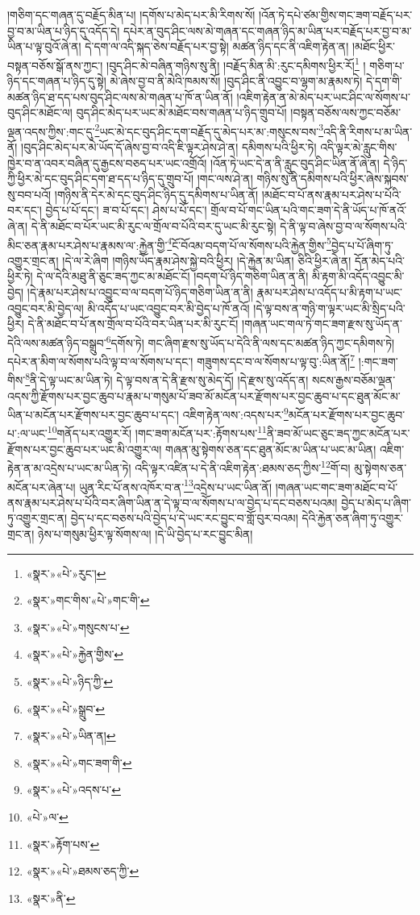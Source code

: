 །གཅིག་དང་གཞན་དུ་བརྗོད་མིན་པ། །དགོས་པ་མེད་པར་མི་རིགས་སོ། །འོན་ཏེ་དཔེ་ཙམ་གྱིས་གང་ཟག་བརྗོད་པར་བྱ་བ་མ་ཡིན་པ་ཉིད་དུ་འདོད་དེ། དཔེར་ན་བུད་ཤིང་ལས་མེ་གཞན་དང་གཞན་ཉིད་མ་ཡིན་པར་བརྗོད་པར་བྱ་བ་མ་ཡིན་པ་ལྟ་བུའོ་ཞེ་ན། དེ་དག་ལ་འདི་སྐད་ཅེས་བརྗོད་པར་བྱ་སྟེ། མཚན་ཉིད་དང་ནི་འཇིག་རྟེན་ན། །མཐོང་ཕྱིར་བསྟན་བཅོས་སྒོ་ནས་ཀྱང་། །བུད་ཤིང་མེ་བཞིན་གཉིས་སུ་ནི། །བརྗོད་མིན་མི་:རུང་དམིགས་ཕྱིར་རོ།\footnote{«སྣར་»«པེ་»རུང་།} །
གཅིག་པ་ཉིད་དང་གཞན་པ་ཉིད་དུ་སྟེ། མེ་ཞེས་བྱ་བ་ནི་མེའི་ཁམས་སོ། །བུད་ཤིང་ནི་འབྱུང་བ་ལྷག་མ་རྣམས་ཏེ། དེ་དག་གི་མཚན་ཉིད་ཐ་དད་པས་བུད་ཤིང་ལས་མེ་གཞན་པ་ཁོ་ན་ཡིན་ནོ། །འཇིག་རྟེན་ན་མེ་མེད་པར་ཡང་ཤིང་ལ་སོགས་པ་བུད་ཤིང་མཐོང་ལ། བུད་ཤིང་མེད་པར་ཡང་མེ་མཐོང་བས་གཞན་པ་ཉིད་གྲུབ་པོ། །བསྟན་བཅོས་ལས་ཀྱང་བཅོམ་ལྡན་འདས་ཀྱིས་:གང་དུ་\footnote{«སྣར་»གང་གིས་«པེ་»གང་གི་}ཡང་མེ་དང་བུད་ཤིང་དག་བརྗོད་དུ་མེད་པར་མ་:གསུངས་བས་\footnote{«སྣར་»«པེ་»གསུངས་པ་}འདི་ནི་རིགས་པ་མ་ཡིན་ནོ། །བུད་ཤིང་མེད་པར་མེ་ཡོད་དོ་ཞེས་བྱ་བ་འདི་ཇི་ལྟར་ཤེས་ཤེ་ན། དམིགས་པའི་ཕྱིར་ཏེ། འདི་ལྟར་མེ་རླུང་གིས་ཁྱེར་བ་ན་འབར་བཞིན་དུ་རྒྱངས་བཅད་པར་ཡང་འགྲོའོ། །འོན་ཏེ་ཡང་དེ་ན་ནི་རླུང་བུད་ཤིང་ཡིན་ནོ་ཞེ་ན། དེ་ཉིད་ཀྱི་ཕྱིར་མེ་དང་བུད་ཤིང་དག་ཐ་དད་པ་ཉིད་དུ་གྲུབ་པོ། །གང་ལས་ཤེ་ན། གཉིས་སུ་ནི་དམིགས་པའི་ཕྱིར་ཞེས་སྐབས་སུ་བབ་པའོ། །གཉིས་ནི་དེར་མེ་དང་བུད་ཤིང་ཉིད་དུ་དམིགས་པ་ཡིན་ནོ། །མཐོང་བ་པོ་ནས་རྣམ་པར་ཤེས་པ་པོའི་བར་དང་། བྱེད་པ་པོ་དང་། ཟ་བ་པོ་དང་། ཤེས་པ་པོ་དང་། གྲོལ་བ་པོ་གང་ཡིན་པའི་གང་ཟག་དེ་ནི་ཡོད་པ་ཁོ་ནའོ་ཞེ་ན། དེ་ནི་མཐོང་བ་པོར་ཡང་མི་རུང་ལ་གྲོལ་བ་པོའི་བར་དུ་ཡང་མི་རུང་སྟེ། དེ་ནི་ལྟ་བ་ཞེས་བྱ་བ་ལ་སོགས་པའི་མིང་ཅན་རྣམ་པར་ཤེས་པ་རྣམས་ལ་:རྐྱེན་གྱི་\footnote{«སྣར་»«པེ་»རྐྱེན་གྱིས་}ངོ་བོའམ་བདག་པོ་ལ་སོགས་པའི་རྐྱེན་གྱིས་\footnote{«སྣར་»«པེ་»ཉིད་ཀྱི་}བྱེད་པ་པོ་ཞིག་ཏུ་འགྱུར་གྲང་ན། །དེ་ལ་རེ་ཞིག །གཉིས་ཡོད་རྣམ་ཤེས་སྐྱེ་བའི་ཕྱིར། །དེ་རྐྱེན་མ་ཡིན། ཅིའི་ཕྱིར་ཞེ་ན། དོན་མེད་པའི་ཕྱིར་ཏེ། དེ་ལ་དེའི་མཐུ་ནི་ཅུང་ཟད་ཀྱང་མ་མཐོང་ངོ། །བདག་པོ་ཉིད་གཅིག་ཡིན་ན་ནི། མི་རྟག་མི་འདོད་འབྱུང་མི་བྱེད། །དེ་རྣམ་པར་ཤེས་པ་འབྱུང་བ་ལ་བདག་པོ་ཉིད་གཅིག་ཡིན་ན་ནི། རྣམ་པར་ཤེས་པ་འདོད་པ་མི་རྟག་པ་ཡང་འབྱུང་བར་མི་བྱེད་ལ། མི་འདོད་པ་ཡང་འབྱུང་བར་མི་བྱེད་པ་ཁོ་ནའོ། །དེ་ལྟ་བས་ན་གཉི་ག་ལྟར་ཡང་མི་སྲིད་པའི་ཕྱིར། དེ་ནི་མཐོང་བ་པོ་ནས་གྲོལ་བ་པོའི་བར་ཡིན་པར་མི་རུང་ངོ། །གཞན་ཡང་གལ་ཏེ་གང་ཟག་རྫས་སུ་ཡོད་ན་དེའི་ལས་མཚན་ཉིད་བསྒྲུབ་\footnote{«སྣར་»«པེ་»སྒྲུབ་}དགོས་ཏེ། གང་ཞིག་རྫས་སུ་ཡོད་པ་དེའི་ནི་ལས་དང་མཚན་ཉིད་ཀྱང་དམིགས་ཏེ། དཔེར་ན་མིག་ལ་སོགས་པའི་ལྟ་བ་ལ་སོགས་པ་དང་། གཟུགས་དང་བ་ལ་སོགས་པ་ལྟ་བུ་:ཡིན་ནོ།\footnote{«སྣར་»«པེ་»ཡིན་ན།} །:གང་ཟག་གིས་\footnote{«སྣར་»«པེ་»གང་ཟག་གི་}ནི་དེ་ལྟ་ཡང་མ་ཡིན་ཏེ། དེ་ལྟ་བས་ན་དེ་ནི་རྫས་སུ་མེད་དོ། །དེ་རྫས་སུ་འདོད་ན། སངས་རྒྱས་བཅོམ་ལྡན་འདས་ཀྱི་རྫོགས་པར་བྱང་ཆུབ་པ་རྣམ་པ་གསུམ་པོ་ཟབ་མོ་མངོན་པར་རྫོགས་པར་བྱང་ཆུབ་པ་དང་ཐུན་མོང་མ་ཡིན་པ་མངོན་པར་རྫོགས་པར་བྱང་ཆུབ་པ་དང་། འཇིག་རྟེན་ལས་:འདས་པར་\footnote{«སྣར་»«པེ་»འདས་པ་}མངོན་པར་རྫོགས་པར་བྱང་ཆུབ་པ་:ལ་ཡང་\footnote{«པེ་»ལ་}གནོད་པར་འགྱུར་རོ། །གང་ཟག་མངོན་པར་:རྟོགས་པས་\footnote{«སྣར་»རྟོག་པས་}ནི་ཟབ་མོ་ཡང་ཅུང་ཟད་ཀྱང་མངོན་པར་རྫོགས་པར་བྱང་ཆུབ་པར་ཡང་མི་འགྱུར་ལ། གཞན་མུ་སྟེགས་ཅན་དང་ཐུན་མོང་མ་ཡིན་པ་ཡང་མ་ཡིན། འཇིག་རྟེན་ན་མ་འདྲེས་པ་ཡང་མ་ཡིན་ཏེ། འདི་ལྟར་འཛིན་པ་དེ་ནི་འཇིག་རྟེན་:ཐམས་ཅད་ཀྱིས་\footnote{«སྣར་»«པེ་»ཐམས་ཅད་ཀྱི་}གོ་བ། མུ་སྟེགས་ཅན་མངོན་པར་ཞེན་པ། ཡུན་རིང་པོ་ནས་འཁོར་བ་ན་\footnote{«སྣར་»ནི་}འདྲེས་པ་ཡང་ཡིན་ནོ། །གཞན་ཡང་གང་ཟག་མཐོང་བ་པོ་ནས་རྣམ་པར་ཤེས་པ་པོའི་བར་ཞིག་ཡིན་ན་དེ་ལྟ་བ་ལ་སོགས་པ་ལ་བྱེད་པ་དང་བཅས་པའམ། བྱེད་པ་མེད་པ་ཞིག་ཏུ་འགྱུར་གྲང་ན། བྱེད་པ་དང་བཅས་པའི་བྱེད་པ་དེ་ཡང་རང་བྱུང་བ་གློ་བུར་བའམ། དེའི་རྐྱེན་ཅན་ཞིག་ཏུ་འགྱུར་གྲང་ན། ཉེས་པ་གསུམ་ཕྱིར་ལྟ་སོགས་ལ། །དེ་ཡི་བྱེད་པ་རང་བྱུང་མིན། 